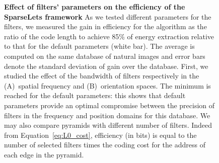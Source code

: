\documentclass[a4paper, 11pt]{book}
\begin{document}
\begin{figure}%
\caption{ {\bf Effect of filters' parameters on the efficiency of the {SparseLets} framework } As we tested different parameters for the filters, we measured the gain in efficiency for the algorithm as the ratio of the code length to achieve 85\% of energy extraction relative to that for the default parameters (white bar). The average is computed on the same database of natural images and error bars denote the standard deviation of gain over the database. First, we studied the effect of the bandwidth of filters respectively in the \textsf{(A)}~spatial frequency and \textsf{(B)}~orientation spaces. The minimum is reached for the default parameters: this shows that default parameters provide an optimal compromise between the precision of filters in the frequency and position domains for this database. We may also compare pyramids with different number of filters.  Indeed from Equation~\ref{eq:L0_cost}, efficiency (in bits) is equal to the number of selected filters times the coding cost for the address of each edge in the pyramid.
}
\end{figure}
\end{document}
